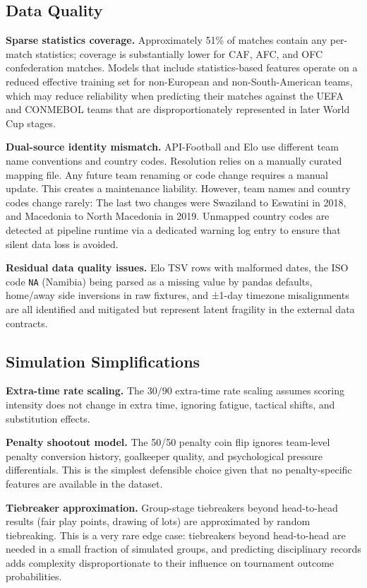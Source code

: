 \documentclass[conference]{IEEEtran}
\begin{document}
\subsection{Data Quality}

\textbf{Sparse statistics coverage.}
Approximately 51\% of matches contain any per-match statistics; coverage is substantially
lower for CAF, AFC, and OFC confederation matches. Models that include statistics-based
features operate on a reduced effective training set for non-European and non-South-American
teams, which may reduce reliability when predicting their matches against the UEFA and CONMEBOL teams that are disproportionately represented in later World Cup stages.

\textbf{Dual-source identity mismatch.}
API-Football and Elo use different team name conventions and country codes. Resolution
relies on a manually curated mapping file. Any future team renaming or code change
requires a manual update. This creates a maintenance liability. However, team names
and country codes change rarely: The last two changes were Swaziland to Eswatini in 2018,
and Macedonia to North Macedonia in 2019. Unmapped country codes are detected at pipeline 
runtime via a dedicated warning log entry to ensure that silent data loss is avoided.

\textbf{Residual data quality issues.}
Elo TSV rows with malformed dates, the ISO code \texttt{NA} (Namibia) being parsed as a
missing value by pandas defaults, home/away side inversions in raw fixtures, and ±1-day
timezone misalignments are all identified and mitigated but represent latent fragility in
the external data contracts.

\subsection{Simulation Simplifications}

\textbf{Extra-time rate scaling.}
The $30/90$ extra-time rate scaling assumes scoring intensity does not change in
extra time, ignoring fatigue, tactical shifts, and substitution effects.

\textbf{Penalty shootout model.}
The 50/50 penalty coin flip ignores team-level penalty conversion history,
goalkeeper quality, and psychological pressure differentials.  This is the
simplest defensible choice given that no penalty-specific features are available
in the dataset.

\textbf{Tiebreaker approximation.}
Group-stage tiebreakers beyond head-to-head results (fair play points, drawing
of lots) are approximated by random tiebreaking.  This is a very rare edge
case: tiebreakers beyond head-to-head are needed in a small fraction of
simulated groups, and predicting disciplinary records adds complexity
disproportionate to their influence on tournament outcome probabilities.
\end{document}
